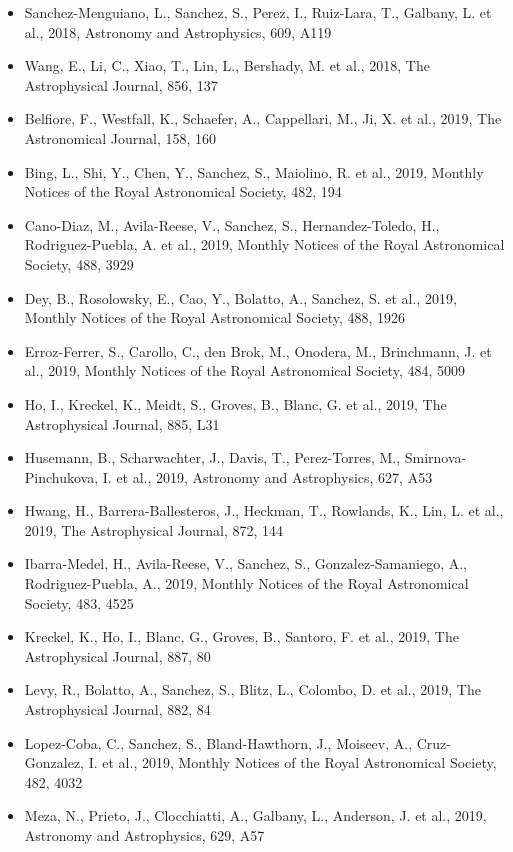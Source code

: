 \documentclass{letter}
\begin{document}
\begin{enumerate}
\begin{itemize}
\item Sanchez-Menguiano, L., Sanchez, S., Perez, I., Ruiz-Lara, T., Galbany, L. et al., 2018, Astronomy and Astrophysics, 609, A119
\item Wang, E., Li, C., Xiao, T., Lin, L., Bershady, M. et al., 2018, The Astrophysical Journal, 856, 137
\item Belfiore, F., Westfall, K., Schaefer, A., Cappellari, M., Ji, X. et al., 2019, The Astronomical Journal, 158, 160
\item Bing, L., Shi, Y., Chen, Y., Sanchez, S., Maiolino, R. et al., 2019, Monthly Notices of the Royal Astronomical Society, 482, 194
\item Cano-Diaz, M., Avila-Reese, V., Sanchez, S., Hernandez-Toledo, H., Rodriguez-Puebla, A. et al., 2019, Monthly Notices of the Royal Astronomical Society, 488, 3929
\item Dey, B., Rosolowsky, E., Cao, Y., Bolatto, A., Sanchez, S. et al., 2019, Monthly Notices of the Royal Astronomical Society, 488, 1926
\item Erroz-Ferrer, S., Carollo, C., den Brok, M., Onodera, M., Brinchmann, J. et al., 2019, Monthly Notices of the Royal Astronomical Society, 484, 5009
\item Ho, I., Kreckel, K., Meidt, S., Groves, B., Blanc, G. et al., 2019, The Astrophysical Journal, 885, L31
\item Husemann, B., Scharwachter, J., Davis, T., Perez-Torres, M., Smirnova-Pinchukova, I. et al., 2019, Astronomy and Astrophysics, 627, A53
\item Hwang, H., Barrera-Ballesteros, J., Heckman, T., Rowlands, K., Lin, L. et al., 2019, The Astrophysical Journal, 872, 144
\item Ibarra-Medel, H., Avila-Reese, V., Sanchez, S., Gonzalez-Samaniego, A., Rodriguez-Puebla, A., 2019, Monthly Notices of the Royal Astronomical Society, 483, 4525
\item Kreckel, K., Ho, I., Blanc, G., Groves, B., Santoro, F. et al., 2019, The Astrophysical Journal, 887, 80
\item Levy, R., Bolatto, A., Sanchez, S., Blitz, L., Colombo, D. et al., 2019, The Astrophysical Journal, 882, 84
\item Lopez-Coba, C., Sanchez, S., Bland-Hawthorn, J., Moiseev, A., Cruz-Gonzalez, I. et al., 2019, Monthly Notices of the Royal Astronomical Society, 482, 4032
\item Meza, N., Prieto, J., Clocchiatti, A., Galbany, L., Anderson, J. et al., 2019, Astronomy and Astrophysics, 629, A57

\end{itemize}
\end{enumerate}
\end{document}
